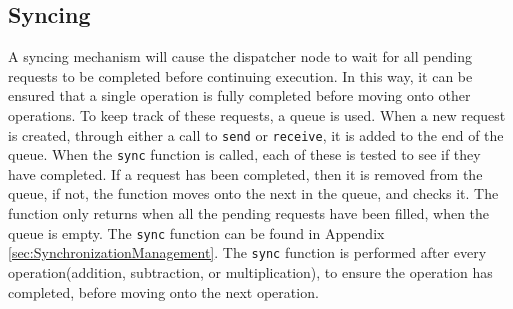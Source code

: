 \subsection{Syncing}
A syncing mechanism will cause the dispatcher node to wait for all pending requests to be completed before continuing execution. In this way, it can be ensured that a single operation is fully completed before moving onto other operations. To keep track of these requests, a queue is used. When a new request is created, through either a call to \verb|send| or \verb|receive|, it is added to the end of the queue. When the \verb|sync| function is called, each of these is tested to see if they have completed. If a request has been completed, then it is removed from the queue, if not, the function moves onto the next in the queue, and checks it. The function only returns when all the pending requests have been filled, when the queue is empty. The \verb|sync| function can be found in Appendix \ref{sec:SynchronizationManagement}. The \verb|sync| function is performed after every operation(addition, subtraction, or multiplication), to ensure the operation has completed, before moving onto the next operation.